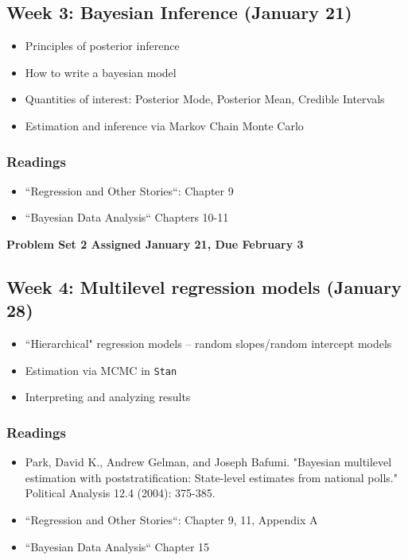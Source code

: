 \documentclass[11pt, article, oneside]{memoir}
\theoremstyle{Assumption}
\begin{document}
\subsection{Week 3: Bayesian Inference (January 21)}

\begin{itemize}
\item Principles of posterior inference
\item How to write a bayesian model
\item Quantities of interest: Posterior Mode, Posterior Mean, Credible Intervals
\item Estimation and inference via Markov Chain Monte Carlo
\end{itemize}

\subsubsection*{Readings}

\begin{itemize}
\item ``Regression and Other Stories``: Chapter 9
\item ``Bayesian Data Analysis`` Chapters 10-11
\end{itemize}


\textbf{Problem Set 2 Assigned January 21, Due February 3}

\subsection{Week 4: Multilevel regression models (January 28)}

\begin{itemize}
\item ``Hierarchical" regression models -- random slopes/random intercept models
\item Estimation via MCMC in \texttt{Stan}
\item Interpreting and analyzing results
\end{itemize}

\subsubsection*{Readings}

\begin{itemize}
\item Park, David K., Andrew Gelman, and Joseph Bafumi. "Bayesian multilevel estimation with poststratification: State-level estimates from national polls." Political Analysis 12.4 (2004): 375-385.
\item ``Regression and Other Stories``: Chapter 9, 11, Appendix A
\item ``Bayesian Data Analysis`` Chapter 15
\end{itemize}
\end{document}
